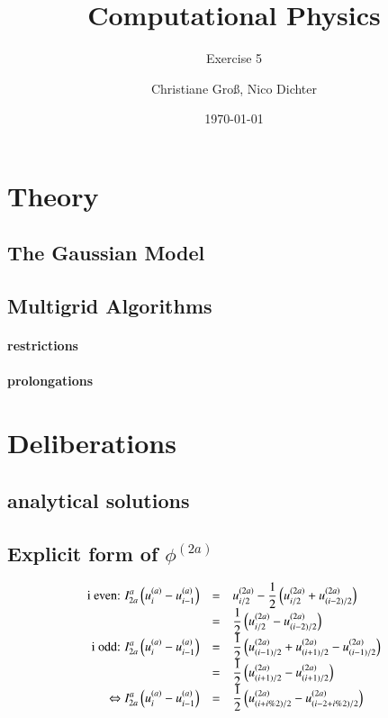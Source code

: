 \documentclass{scrartcl}
\title{Computational Physics}
\subtitle{Exercise 5}
\date{\today}
\author{Christiane Groß, Nico Dichter}
\begin{document}
	\maketitle
	
\section{Theory}
\subsection{The Gaussian Model}

\subsection{Multigrid Algorithms}
\paragraph{restrictions}
\paragraph{prolongations}

\section{Deliberations}

\subsection{analytical solutions}

\subsection{Explicit form of $\phi^{(2a)}$}

\[\begin{array}{>{\displaystyle}r>{\displaystyle}c>{\displaystyle}l}
\text{i even: } I_{2a}^a\left( u_i^{(a)}-u_{i-1}^{(a)}\right)  &=&u_{i/2}^{(2a)}-\frac{1}{2}\left(u_{i/2}^{(2a)}+u_{(i-2)/2}^{(2a)} \right) \\
&=&\frac{1}{2}\left(u_{i/2}^{(2a)}-u_{(i-2)/2}^{(2a)}\right) \\

\text{i odd: } I_{2a}^a\left( u_i^{(a)}-u_{i-1}^{(a)}\right)  &=&\frac{1}{2}\left(u_{(i-1)/2}^{(2a)}+u_{(i+1)/2}^{(2a)}-u_{(i-1)/2}^{(2a)} \right) \\
&=&\frac{1}{2}\left(u_{(i+1)/2}^{(2a)}-u_{(i+1)/2}^{(2a)}\right) \\

\Leftrightarrow I_{2a}^a\left( u_i^{(a)}-u_{i-1}^{(a)}\right)&=&
\frac{1}{2}\left(u_{(i+i\%2)/2}^{(2a)}-u_{(i-2+i\%2)/2}^{(2a)}\right) \\

\end{array}\]
\end{document}
